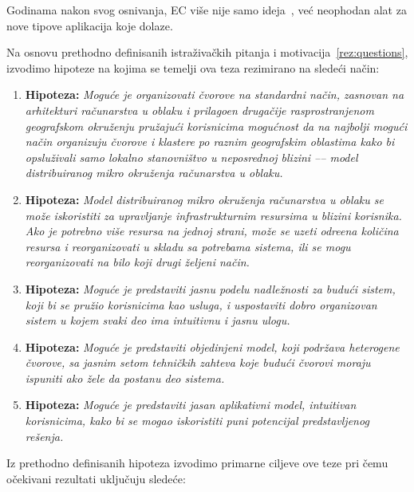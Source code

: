Godinama nakon svog osnivanja, EC vi\v se nije samo ideja~\cite{SatyanarayananK19}, ve\'c neophodan alat za nove tipove aplikacija koje dolaze.

Na osnovu prethodno definisanih istra\v ziva\v ckih pitanja i motivacija~\ref{rez:questions}, izvodimo hipoteze na kojima se temelji ova teza rezimirano na slede\'ci na\v cin:

\begin{enumerate}[start=1,label={(\bfseries \arabic*)}]
	\item \textbf{Hipoteza:} \textit{Mogu\'ce je organizovati \v cvorove na standardni na\v cin, zasnovan na arhitekturi ra\v cunarstva u oblaku i prilago\dj en druga\v cije rasprostranjenom geografskom okru\v zenju pru\v zaju\'ci korisnicima mogu\'cnost da na najbolji mogu\'ci na\v cin organizuju \v cvorove i klastere po raznim geografskim oblastima kako bi opslu\v zivali samo lokalno stanovni\v stvo u neposrednoj blizini –-- model distribuiranog mikro okru\v zenja ra\v cunarstva u oblaku.}
	\item \textbf{Hipoteza:} \textit{Model distribuiranog mikro okru\v zenja ra\v cunarstva u oblaku se mo\v ze iskoristiti za upravljanje infrastrukturnim resursima u blizini korisnika. Ako je potrebno vi\v se resursa na jednoj strani, mo\v ze se uzeti odre\dj ena koli\v cina resursa i reorganizovati u skladu sa potrebama sistema, ili se mogu reorganizovati na bilo koji drugi \v zeljeni na\v cin.}
	\item \textbf{Hipoteza:} \textit{Mogu\'ce je predstaviti jasnu podelu nadle\v znosti za budu\'ci sistem, koji bi se pru\v zio korisnicima kao usluga, i uspostaviti dobro organizovan sistem u kojem svaki deo ima intuitivnu i jasnu ulogu.}
	\item \textbf{Hipoteza:} \textit{Mogu\'ce je predstaviti objedinjeni model, koji podr\v zava heterogene \v cvorove, sa jasnim setom tehni\v ckih zahteva koje budu\'ci \v cvorovi moraju ispuniti ako \v zele da postanu deo sistema.}
	\item \textbf{Hipoteza:} \textit{Mogu\'ce je predstaviti jasan aplikativni model, intuitivan korisnicima, kako bi se mogao iskoristiti puni potencijal predstavljenog re\v senja.}
\end{enumerate}

Iz prethodno definisanih hipoteza izvodimo primarne ciljeve ove teze pri \v cemu o\v cekivani rezultati uklju\v cuju slede\'ce:

